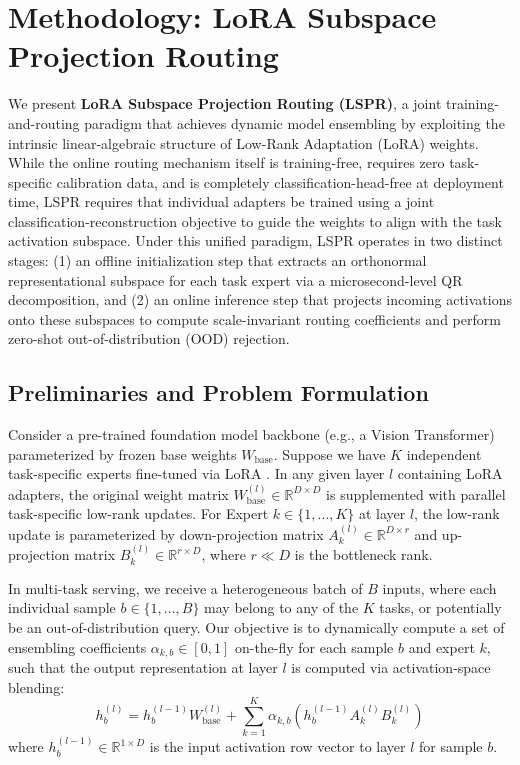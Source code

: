 \section{Methodology: LoRA Subspace Projection Routing}
\label{sec:method}

We present \textbf{LoRA Subspace Projection Routing (LSPR)}, a joint training-and-routing paradigm that achieves dynamic model ensembling by exploiting the intrinsic linear-algebraic structure of Low-Rank Adaptation (LoRA) weights. While the online routing mechanism itself is training-free, requires zero task-specific calibration data, and is completely classification-head-free at deployment time, LSPR requires that individual adapters be trained using a joint classification-reconstruction objective to guide the weights to align with the task activation subspace. Under this unified paradigm, LSPR operates in two distinct stages: (1) an offline initialization step that extracts an orthonormal representational subspace for each task expert via a microsecond-level QR decomposition, and (2) an online inference step that projects incoming activations onto these subspaces to compute scale-invariant routing coefficients and perform zero-shot out-of-distribution (OOD) rejection.

\subsection{Preliminaries and Problem Formulation}
\label{subsec:method_prelims}

Consider a pre-trained foundation model backbone (e.g., a Vision Transformer) parameterized by frozen base weights $W_{\text{base}}$. Suppose we have $K$ independent task-specific experts fine-tuned via LoRA \cite{hu2021lora}. In any given layer $l$ containing LoRA adapters, the original weight matrix $W_{\text{base}}^{(l)} \in \mathbb{R}^{D \times D}$ is supplemented with parallel task-specific low-rank updates. For Expert $k \in \{1, \dots, K\}$ at layer $l$, the low-rank update is parameterized by down-projection matrix $A_k^{(l)} \in \mathbb{R}^{D \times r}$ and up-projection matrix $B_k^{(l)} \in \mathbb{R}^{r \times D}$, where $r \ll D$ is the bottleneck rank.

In multi-task serving, we receive a heterogeneous batch of $B$ inputs, where each individual sample $b \in \{1, \dots, B\}$ may belong to any of the $K$ tasks, or potentially be an out-of-distribution query. Our objective is to dynamically compute a set of ensembling coefficients $\alpha_{k, b} \in [0, 1]$ on-the-fly for each sample $b$ and expert $k$, such that the output representation at layer $l$ is computed via activation-space blending:
\begin{equation}
    h_b^{(l)} = h_b^{(l-1)} W_{\text{base}}^{(l)} + \sum_{k=1}^K \alpha_{k, b} \left( h_b^{(l-1)} A_k^{(l)} B_k^{(l)} \right)
\end{equation}
where $h_b^{(l-1)} \in \mathbb{R}^{1 \times D}$ is the input activation row vector to layer $l$ for sample $b$.

